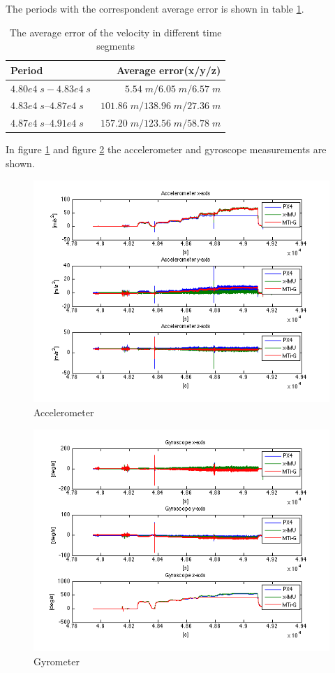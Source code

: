 The periods with the correspondent average error is shown in table \ref{ct_vel_error}.
\begin{table}[h]
\centering
\begin{tabular}{|l|r|}
\hline
Period & Average error(x/y/z) \\
\hline
$4.80e4\;s - 4.83e4\;s$&$5.54\;m / 6.05\;m / 6.57\;m$\\
\hline
$4.83e4\;s – 4.87e4\;s$&$101.86\;m / 138.96\;m/ 27.36\;m$\\
\hline
$4.87e4\;s – 4.91e4\;s$&$157.20\;m / 123.56\;m / 58.78\;m$\\
\hline
\end{tabular}
\caption{The average error of the velocity in different time segments}
\label{ct_vel_error}
\end{table}
In figure \ref{ct_acc} and figure \ref{ct_gyro} the accelerometer and gyroscope measurements are shown. 
\begin{figure}[h]
\includegraphics[width=1\textwidth]{pictures/ct_acc.png}
\caption{Accelerometer}
\label{ct_acc}
\end{figure}
\begin{figure}[hb]
\includegraphics[width=1\textwidth]{pictures/ct_gyro.png}
\caption{Gyrometer}
\label{ct_gyro}
\end{figure}
